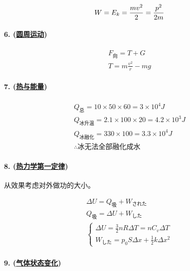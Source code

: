 \begin{equation*}
        W=E_k=\frac{mv^2}{2}=\frac{p^2}{2m}\\
\end{equation*}

\paragraph{6. (\hyperref[subsec:圆周运动]{圆周运动})}

\begin{gather*}
    F_\textrm{向}=T+G\\
    T=m\frac{v^2}{r}-mg
\end{gather*}

\paragraph{7. (\hyperref[sec:热与能量]{热与能量})}

\begin{gather*}
    Q_\textrm{总}=10\times50\times60=3\times10^4J\\
    Q_\textrm{冰升温}=2.1\times100\times20=4.2\times10^3J\\
    Q_\textrm{冰融化}=330\times100=3.3\times10^4J\\
    \therefore\textrm{冰无法全部融化成水}
\end{gather*}

\paragraph{8. (\hyperref[subsec:热力学第一定律]{热力学第一定律})} 从效果考虑对外做功的大小。

\begin{gather*}
    \Delta U=Q_\textrm{吸}+W_\textrm{された}\\
    Q_\textrm{吸}=\Delta U+W_\textrm{した}\\
    \begin{cases}
        \Delta U=\frac32nR\Delta T=nC_v\Delta T\\
        W_\textrm{した}=p_0S\Delta x+\frac12k\Delta x^2
    \end{cases}
\end{gather*}

\paragraph{9. (\hyperref[subsec:气体状态变化]{气体状态变化})}

